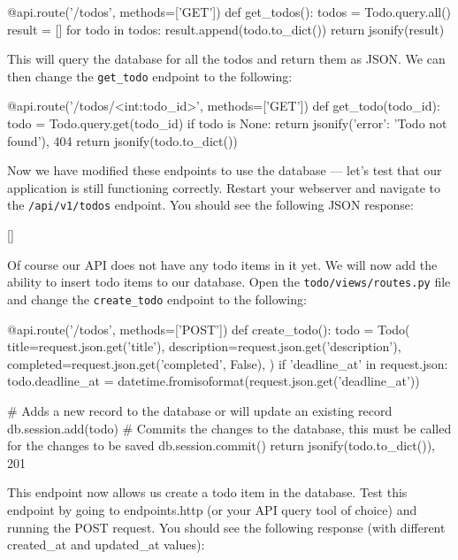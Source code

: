 \documentclass{csse4400}
\begin{document}
\begin{code}[language=python,numbers=none]{}
@api.route('/todos', methods=['GET'])
def get_todos():
    todos = Todo.query.all()
    result = []
    for todo in todos:
        result.append(todo.to_dict())
    return jsonify(result)
\end{code}

This will query the database for all the todos and return them as JSON.
We can then change the \texttt{get\_todo} endpoint to the following:

\begin{code}[language=python,numbers=none]{}
@api.route('/todos/<int:todo_id>', methods=['GET'])
def get_todo(todo_id):
    todo = Todo.query.get(todo_id)
    if todo is None:
        return jsonify({'error': 'Todo not found'}), 404
    return jsonify(todo.to_dict())
\end{code}

Now we have modified these endpoints to use the database --- let's test that our application is still functioning correctly.
Restart your webserver and navigate to the \texttt{/api/v1/todos} endpoint.
You should see the following JSON response:

\begin{code}[language=json,numbers=none]{}
  []
\end{code}

Of course our API does not have any todo items in it yet.
We will now add the ability to insert todo items to our database.
Open the \texttt{todo/views/routes.py} file and change the \texttt{create\_todo} endpoint to the following:

\begin{code}[language=python,numbers=none]{}
@api.route('/todos', methods=['POST'])
def create_todo():
    todo = Todo(
        title=request.json.get('title'),
        description=request.json.get('description'),
        completed=request.json.get('completed', False),
    )
    if 'deadline_at' in request.json:
        todo.deadline_at = datetime.fromisoformat(request.json.get('deadline_at'))

    # Adds a new record to the database or will update an existing record
    db.session.add(todo)
    # Commits the changes to the database, this must be called for the changes to be saved
    db.session.commit()
    return jsonify(todo.to_dict()), 201
\end{code}

This endpoint now allows us create a todo item in the database.
Test this endpoint by going to endpoints.http (or your API query tool of choice) and running the POST request.
You should see the following response (with different created\_at and updated\_at values):
\end{document}
